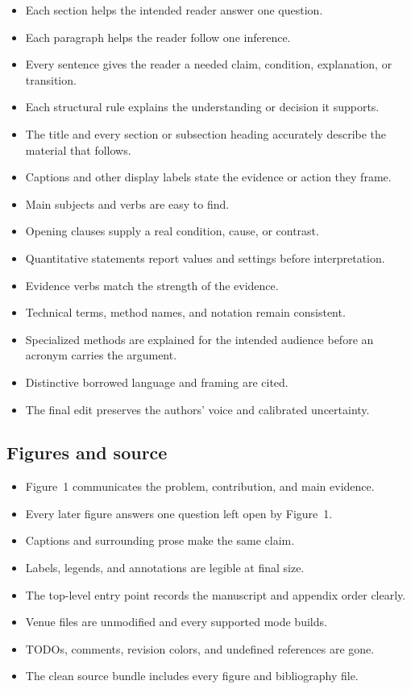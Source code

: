 \begin{itemize}[leftmargin=*,label=\(\square\)]
    \item Each section helps the intended reader answer one question.
    \item Each paragraph helps the reader follow one inference.
    \item Every sentence gives the reader a needed claim, condition,
    explanation, or transition.
    \item Each structural rule explains the understanding or decision it
    supports.
    \item The title and every section or subsection heading accurately
    describe the material that follows.
    \item Captions and other display labels state the evidence or action they
    frame.
    \item Main subjects and verbs are easy to find.
    \item Opening clauses supply a real condition, cause, or contrast.
    \item Quantitative statements report values and settings before
    interpretation.
    \item Evidence verbs match the strength of the evidence.
    \item Technical terms, method names, and notation remain consistent.
    \item Specialized methods are explained for the intended audience before
    an acronym carries the argument.
    \item Distinctive borrowed language and framing are cited.
    \item The final edit preserves the authors' voice and calibrated
    uncertainty.
\end{itemize}

\subsection{Figures and source}

\begin{itemize}[leftmargin=*,label=\(\square\)]
    \item Figure~1 communicates the problem, contribution, and main evidence.
    \item Every later figure answers one question left open by Figure~1.
    \item Captions and surrounding prose make the same claim.
    \item Labels, legends, and annotations are legible at final size.
    \item The top-level entry point records the manuscript and appendix order
    clearly.
    \item Venue files are unmodified and every supported mode builds.
    \item TODOs, comments, revision colors, and undefined references are gone.
    \item The clean source bundle includes every figure and bibliography file.
\end{itemize}

